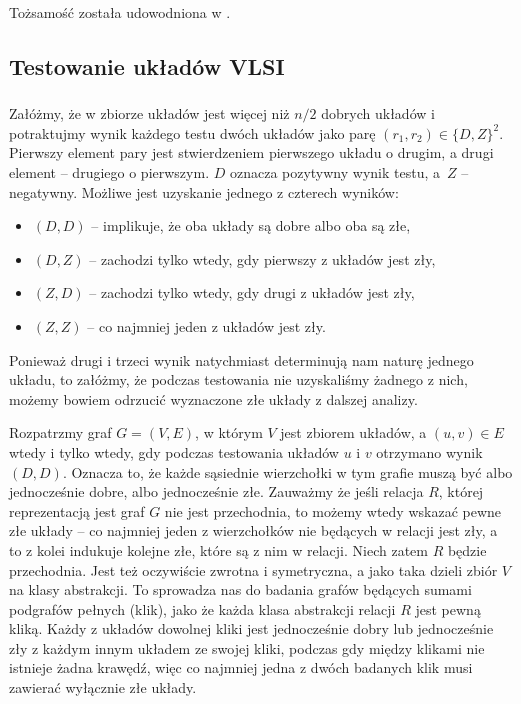 \subsubsection{} %
Tożsamość została udowodniona w .

\subsection{Testowanie układów VLSI} %

\subsubsection{} %
Załóżmy, że w zbiorze układów jest więcej niż $n/2$ dobrych układów i potraktujmy wynik każdego testu dwóch układów jako parę $(r_1,r_2)\in\{D,Z\}^2$. Pierwszy element pary jest stwierdzeniem pierwszego układu o drugim, a drugi element -- drugiego o pierwszym. $D$ oznacza pozytywny wynik testu, a~$Z$ -- negatywny. Możliwe jest uzyskanie jednego z czterech wyników:
\begin{itemize}
	\item $(D,D)$ -- implikuje, że oba układy są dobre albo oba są złe,
	\item $(D,Z)$ -- zachodzi tylko wtedy, gdy pierwszy z układów jest zły,
	\item $(Z,D)$ -- zachodzi tylko wtedy, gdy drugi z układów jest zły,
	\item $(Z,Z)$ -- co najmniej jeden z układów jest zły.
\end{itemize}
Ponieważ drugi i trzeci wynik natychmiast determinują nam naturę jednego układu, to załóżmy, że podczas testowania nie uzyskaliśmy żadnego z nich, możemy bowiem odrzucić wyznaczone złe układy z dalszej analizy.

Rozpatrzmy graf $G=(V,E)$, w którym $V$ jest zbiorem układów, a $(u,v)\in E$ wtedy i tylko wtedy, gdy podczas testowania układów $u$ i $v$ otrzymano wynik $(D,D)$. Oznacza to, że każde sąsiednie wierzchołki w tym grafie muszą być albo jednocześnie dobre, albo jednocześnie złe. Zauważmy że jeśli relacja $R$, której reprezentacją jest graf $G$ nie jest przechodnia, to możemy wtedy wskazać pewne złe układy -- co najmniej jeden z wierzchołków nie będących w relacji jest zły, a to z kolei indukuje kolejne złe, które są z nim w relacji. Niech zatem $R$ będzie przechodnia. Jest też oczywiście zwrotna i symetryczna, a jako taka dzieli zbiór $V$ na klasy abstrakcji. To sprowadza nas do badania grafów będących sumami podgrafów pełnych (klik), jako że każda klasa abstrakcji relacji $R$ jest pewną kliką. Każdy z układów dowolnej kliki jest jednocześnie dobry lub jednocześnie zły z każdym innym układem ze swojej kliki, podczas gdy między klikami nie istnieje żadna krawędź, więc co najmniej jedna z dwóch badanych klik musi zawierać wyłącznie złe układy.

